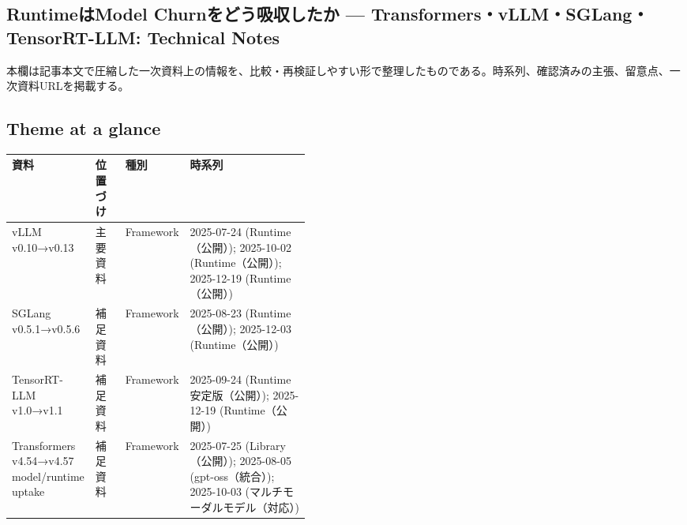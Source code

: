 \subsection*{RuntimeはModel Churnをどう吸収したか — Transformers・vLLM・SGLang・TensorRT-LLM: Technical Notes}
本欄は記事本文で圧縮した一次資料上の情報を、比較・再検証しやすい形で整理したものである。時系列、確認済みの主張、留意点、一次資料URLを掲載する。
\medskip
\subsection*{Theme at a glance}
\begin{center}
\footnotesize
\begin{tabularx}{\linewidth}{@{}p{0.20\linewidth}p{0.10\linewidth}p{0.14\linewidth}X@{}}
\toprule
資料 & 位置づけ & 種別 & 時系列 \\
\midrule
vLLM v0.10→v0.13 & 主要資料 & Framework & 2025-07-24 (Runtime（公開）); 2025-10-02 (Runtime（公開）); 2025-12-19 (Runtime（公開）)    \\
SGLang v0.5.1→v0.5.6 & 補足資料 & Framework & 2025-08-23 (Runtime（公開）); 2025-12-03 (Runtime（公開）)    \\
TensorRT-LLM v1.0→v1.1 & 補足資料 & Framework & 2025-09-24 (Runtime安定版（公開）); 2025-12-19 (Runtime（公開）)    \\
Transformers v4.54→v4.57 model/runtime uptake & 補足資料 & Framework & 2025-07-25 (Library（公開）); 2025-08-05 (gpt-oss（統合）); 2025-10-03 (マルチモーダルモデル（対応）)    \\
\bottomrule
\end{tabularx}
\end{center}
\normalsize

